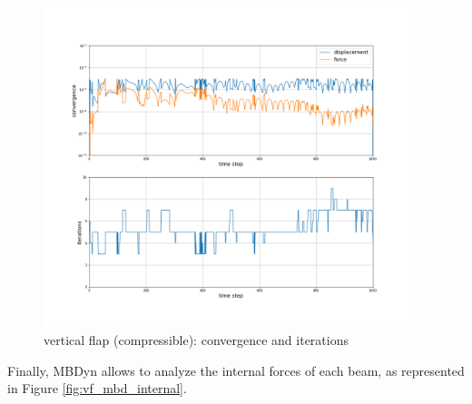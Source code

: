 \begin{figure}[htbp!]
	\centering
	\includegraphics[width=0.95\textwidth, trim=0 1500 0 50, clip]{images/comp_flap/MBD_iterations_comp.png}
	\caption{vertical flap (compressible): convergence and iterations}
	\label{fig:comp_mbd_iter}
\end{figure}


Finally, MBDyn allows to analyze the internal forces of each beam, as represented in Figure \ref{fig:vf_mbd_internal}.

